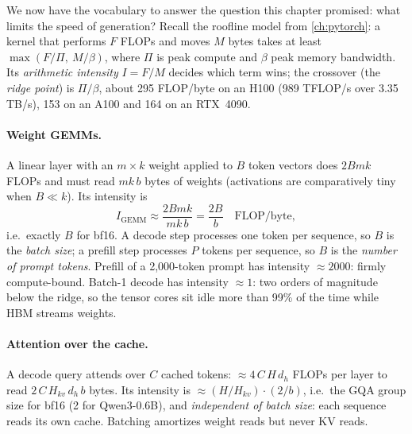 We now have the vocabulary to answer the question this chapter promised: what limits the speed of
generation? Recall the roofline model from \cref{ch:pytorch}: a kernel that performs $F$ FLOPs and
moves $M$ bytes takes at least $\max(F/\Pi,\ M/\beta)$, where $\Pi$ is peak compute and $\beta$
peak memory bandwidth. Its \emph{arithmetic intensity} $I=F/M$ decides which term wins; the
crossover (the \emph{ridge point}) is $\Pi/\beta$, about 295 FLOP/byte on an H100 (989 TFLOP/s over
3.35 TB/s), 153 on an A100 and 164 on an RTX~4090.

\paragraph{Weight GEMMs.} A linear layer with an $m\times k$ weight applied to $B$ token vectors
does $2Bmk$ FLOPs and must read $mk\,b$ bytes of weights (activations are comparatively tiny when
$B\ll k$). Its intensity is
\begin{equation}\label{eq:inference:intensity}
  I_{\text{GEMM}} \approx \frac{2Bmk}{mk\,b} = \frac{2B}{b} \quad\text{FLOP/byte},
\end{equation}
i.e.\ exactly $B$ for bf16. A decode step processes one token per sequence, so $B$ is the
\emph{batch size}; a prefill step processes $P$ tokens per sequence, so $B$ is the \emph{number of
prompt tokens}. Prefill of a 2,000-token prompt has intensity $\approx2000$: firmly compute-bound.
Batch-1 decode has intensity $\approx1$: two orders of magnitude below the ridge, so the tensor cores
sit idle more than 99\% of the time while HBM streams weights.

\paragraph{Attention over the cache.} A decode query attends over $C$ cached tokens: $\approx4\,C\,H\,d_h$
FLOPs per layer to read $2\,C\,H_{kv}\,d_h\,b$ bytes. Its intensity is $\approx(H/H_{kv})\cdot(2/b)$,
i.e.\ the GQA group size for bf16 (2 for Qwen3-0.6B), and \emph{independent of batch size}: each
sequence reads its own cache. Batching amortizes weight reads but never KV reads.

